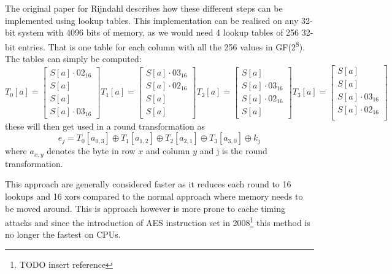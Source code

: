 \documentclass[a4paper]{article}
\begin{document}
The original paper for Rijndahl\cite{Rijndahl} describes how these different steps can be implemented using lookup tables. This implementation can be realised on any 32-bit system with 4096 bits of memory, as we would need 4 lookup tables of 256 32-bit entries. That is one table for each column with all the 256 values in GF(2\textsuperscript{8}). The tables can simply be computed:
\begin{equation}
T_0[a] = \begin{bmatrix}
          S[a] \cdot 02_{16}\\
          S[a]\\
          S[a]\\
          S[a] \cdot 03_{16}
\end{bmatrix}
T_1[a] = \begin{bmatrix}
          S[a] \cdot 03_{16}\\
          S[a] \cdot 02_{16}\\
          S[a]\\
          S[a]
\end{bmatrix}
T_2[a] = \begin{bmatrix}
          S[a]\\
          S[a] \cdot 03_{16}\\
          S[a] \cdot 02_{16}\\
          S[a]
\end{bmatrix}
T_3[a] = \begin{bmatrix}
          S[a]\\
          S[a]\\
          S[a] \cdot 03_{16}\\
          S[a] \cdot 02_{16}\\
\end{bmatrix}
\end{equation}
these will then get used in a round transformation as
\begin{equation}
e_j = T_0 [a_{0,3}] \oplus T_1 [a_{1,2}] \oplus T_2 [a_{2,1}] \oplus T_3 [a_{3,0}] \oplus k_j
\end{equation}
where \(a_{x,y}\) denotes the byte in row \(x\) and column \(y\) and j is the round transformation.

This approach are generally considered faster as it reduces each round to 16 lookups and 16 xors compared to the normal approach where memory needs to be moved around. This is approach however is more prone to cache timing attacks and since the introduction of AES instruction set in 2008\cite{intel}\footnote{TODO insert reference} this method is no longer the fastest on CPUs.
\end{document}
